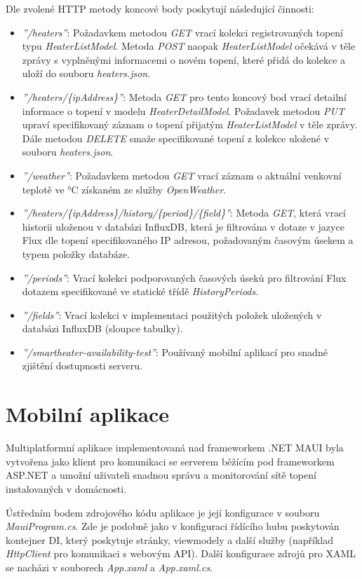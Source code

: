 \noindent Dle zvolené HTTP metody koncové body poskytují následující činnosti:
\begin{itemize}
    \item {\it ''/heaters''}: Požadavkem metodou {\it GET} vrací kolekci registrovaných topení typu {\it HeaterListModel}. Metoda {\it POST} naopak {\it HeaterListModel} očekává v těle zprávy s vyplněnými informacemi o novém topení, které přidá do kolekce a uloží do souboru {\it heaters.json}.
    \item {\it ''/heaters/\{ipAddress\}''}: Metoda {\it GET} pro tento koncový bod vrací detailní informace o topení v modelu {\it HeaterDetailModel}. Požadavek metodou {\it PUT} upraví specifikovaný záznam o topení přijatým {\it HeaterListModel} v těle zprávy. Dále metodou {\it DELETE} smaže specifikované topení z kolekce uložené v souboru {\it heaters.json}.
    \item {\it ''/weather''}: Požadavkem metodou {\it GET} vrací záznam o aktuální venkovní teplotě ve °C získaném ze služby {\it OpenWeather}.
    \item {\it ''/heaters/\{ipAddress\}/history/\{period\}/\{field\}''}: Metoda {\it GET}, která vrací historii uloženou v databázi InfluxDB, která je filtrována v dotaze v jazyce Flux dle topení specifikovaného IP adresou, požadovaným časovým úsekem a typem položky databáze.
    \item {\it ''/periods''}: Vrací kolekci podporovaných časových úseků pro filtrování Flux dotazem specifikované ve statické třídě {\it HistoryPeriods}.
    \item {\it ''/fields''}: Vrací kolekci v implementaci použitých položek uložených v databázi InfluxDB (sloupce tabulky). 
    \item {\it ''/smartheater-availability-test''}: Používaný mobilní aplikací pro snadné zjištění dostupnosti serveru.
\end{itemize}


\section{Mobilní aplikace}
Multiplatformní aplikace implementovaná nad frameworkem .NET MAUI byla vytvořena jako klient pro komunikaci se serverem běžícím pod frameworkem ASP.NET a umožní uživateli snadnou správu a monitorování sítě topení instalovaných v domácnosti.

Ústředním bodem zdrojového kódu aplikace je její konfigurace v souboru {\it MauiProgram.cs}. Zde je podobně jako v konfiguraci řídícího hubu poskytován kontejner DI, který poskytuje stránky, viewmodely a další služby (například {\it HttpClient} pro komunikaci s webovým API). Další konfigurace zdrojů pro XAML se nacházi v souborech {\it App.xaml} a {\it App.xaml.cs}.

